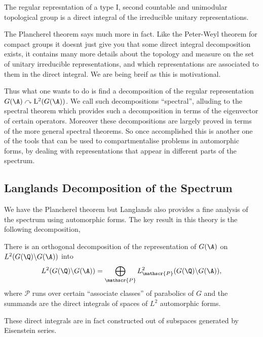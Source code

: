 \begin{Theorem}
    The regular represntation of a type I, second countable and unimodular topological group is a direct integral of the irreducible unitary representations. 
\end{Theorem}
\begin{remark}
    The Plancherel theorem says much more in fact. Like the Peter-Weyl theorem for compact groups it doesnt just give you that some direct integral decomposition exists, it contains many more details about the topology and measure on the set of unitary irreducible representations, and which representations are associated to them in the direct integral. We are being breif as this is motivational.
\end{remark}

Thus what one wants to do is find a decomposition of the regular representation \(G(\A) \curvearrowright \mathrm{L}^2(G(\A))\).
We call such decompositions ``spectral'', alluding to the spectral theorem which provides such a decomposition in terms of the eigenvector of certain operators. Moreover these decompositions are largely proved in terms of the more general spectral theorems. So once accomplished this is another one of the tools that can be used to compartmentalise problems in automorphic forms, by dealing with representations that appear in different parts of the spectrum. 

\subsection{Langlands Decomposition of the Spectrum }
We have the Plancherel theorem but Langlands also provides a fine analysis of the spectrum using automorphic forms. The key result in this theory is the following decomposition,
\begin{Theorem}
    There is an orthogonal decomposition of the representation of \(G(\A)\) on \(L^2(G(\Q) \backslash G(\A))\) into 
    \[L^2(G(\Q) \backslash G(\A)) = \bigoplus_{\mathscr{P}}L^2_\mathscr{P}(G(\Q) \backslash G(\A)),\]
    where \(\mathscr{P}\) runs over certain ``associate classes'' of parabolics of \(G\) and the summands are the direct integrals of spaces of \(L^2\) automorphic forms.
\end{Theorem}
These direct integrals are in fact constructed out of subspaces generated by Eisenstein series. 

